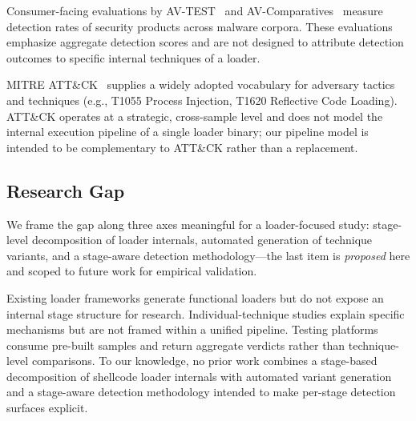 Consumer-facing evaluations by AV-TEST~\cite{avtest} and AV-Comparatives~\cite{avcomparatives} measure detection rates of security products across malware corpora.
These evaluations emphasize aggregate detection scores and are not designed to attribute detection outcomes to specific internal techniques of a loader.

MITRE ATT\&CK~\cite{mitre_attack} supplies a widely adopted vocabulary for adversary tactics and techniques (e.g., T1055 Process Injection, T1620 Reflective Code Loading).
ATT\&CK operates at a strategic, cross-sample level and does not model the internal execution pipeline of a single loader binary; our pipeline model is intended to be complementary to ATT\&CK rather than a replacement.

\subsection{Research Gap}

We frame the gap along three axes meaningful for a loader-focused study: stage-level decomposition of loader internals, automated generation of technique variants, and a stage-aware detection methodology---the last item is \textit{proposed} here and scoped to future work for empirical validation.

Existing loader frameworks generate functional loaders but do not expose an internal stage structure for research.
Individual-technique studies explain specific mechanisms but are not framed within a unified pipeline.
Testing platforms consume pre-built samples and return aggregate verdicts rather than technique-level comparisons.
To our knowledge, no prior work combines a stage-based decomposition of shellcode loader internals with automated variant generation and a stage-aware detection methodology intended to make per-stage detection surfaces explicit.
